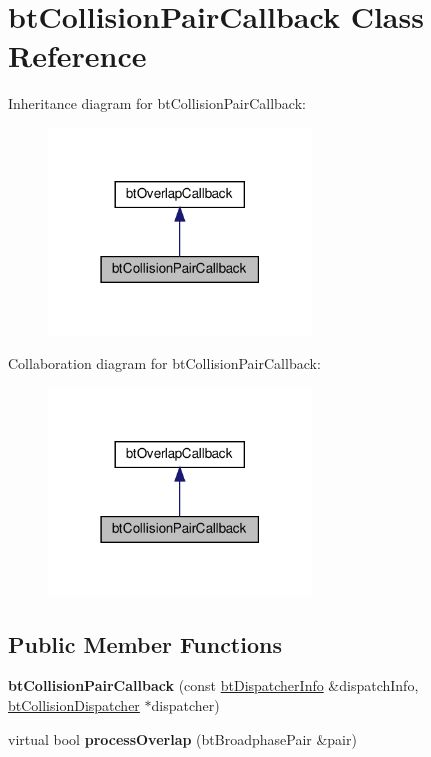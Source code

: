 \hypertarget{classbtCollisionPairCallback}{}\section{bt\+Collision\+Pair\+Callback Class Reference}
\label{classbtCollisionPairCallback}


Inheritance diagram for bt\+Collision\+Pair\+Callback\+:
\nopagebreak
\begin{figure}[H]
\begin{center}
\leavevmode
\includegraphics[width=198pt]{classbtCollisionPairCallback__inherit__graph}
\end{center}
\end{figure}


Collaboration diagram for bt\+Collision\+Pair\+Callback\+:
\nopagebreak
\begin{figure}[H]
\begin{center}
\leavevmode
\includegraphics[width=198pt]{classbtCollisionPairCallback__coll__graph}
\end{center}
\end{figure}
\subsection*{Public Member Functions}
\begin{DoxyCompactItemize}
\item 
\mbox{\label{classbtCollisionPairCallback_ac7ffa05c87dac7a222237382814a737f}} 
{\bfseries bt\+Collision\+Pair\+Callback} (const \hyperlink{structbtDispatcherInfo}{bt\+Dispatcher\+Info} \&dispatch\+Info, \hyperlink{classbtCollisionDispatcher}{bt\+Collision\+Dispatcher} $\ast$dispatcher)
\item 
\mbox{\label{classbtCollisionPairCallback_a6a38dbec8b50c4587a8c8be41b705048}} 
virtual bool {\bfseries process\+Overlap} (bt\+Broadphase\+Pair \&pair)
\end{DoxyCompactItemize}


